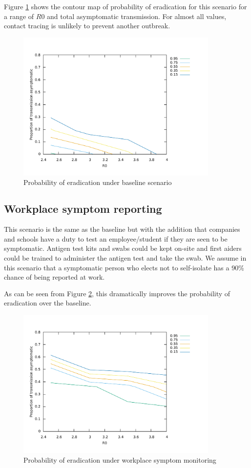 \documentclass{article}
\begin{document}
Figure \ref{baseline} shows the contour map of probability of eradication for this scenario for a range of $R0$ and total asymptomatic transmission. For almost all values, contact tracing is unlikely to prevent another outbreak.

\begin{figure}
\begin{center}
\includegraphics[width = 10cm]{baseline.pdf}
\end{center}
\caption{Probability of eradication under baseline scenario}
\label{baseline}
\end{figure}

\subsection{Workplace symptom reporting}

This scenario is the same as the baseline but with the addition that companies and schools have a duty to test an employee/student if they are seen to be symptomatic. Antigen test kits and swabs could be kept on-site and first aiders could be trained to administer the antigen test and take the swab. We assume in this scenario that a symptomatic person who elects not to self-isolate has a 90\% chance of being reported at work.

As can be seen from Figure \ref{workplaceSymptom}, this dramatically improves the probability of eradication over the baseline.

\begin{figure}
\begin{center}
\includegraphics[width = 10cm]{workplaceSymptomMonitoring.pdf}
\end{center}
\caption{Probability of eradication under workplace symptom monitoring}
\label{workplaceSymptom}
\end{figure}
\end{document}
